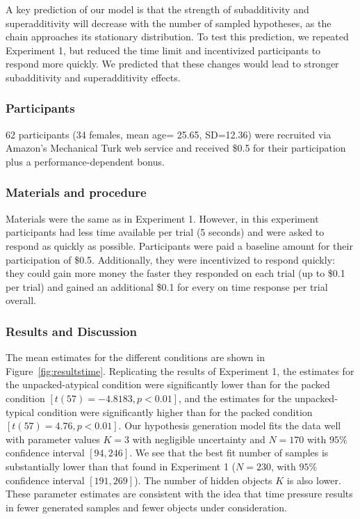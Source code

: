 A key prediction of our model is that the strength of subadditivity and superadditivity will decrease with the number of sampled hypotheses, as the chain approaches its stationary distribution. To test this prediction, we repeated Experiment 1, but reduced the time limit and incentivized participants to respond more quickly. We predicted that these changes would lead to stronger subadditivity and superadditivity effects.

\subsubsection{Participants}
62 participants (34 females, mean age= 25.65, SD=12.36) were recruited via Amazon's Mechanical Turk web service and received \$0.5 for their participation plus a performance-dependent bonus.

\subsubsection{Materials and procedure}
Materials were the same as in Experiment 1. However, in this experiment participants had less time available per trial (5 seconds) and were asked to respond as quickly as possible. Participants were paid a baseline amount for their participation of \$0.5. Additionally, they were incentivized to respond quickly: they could gain more money the faster they responded on each trial (up to \$0.1 per trial) and gained an additional \$0.1 for every on time response per trial overall.

\subsubsection{Results and Discussion}

The mean estimates for the different conditions are shown in Figure~\ref{fig:resultstime}. Replicating the results of Experiment 1, the estimates for the unpacked-atypical condition were significantly lower than for the packed condition $[t(57)=-4.8183, p<0.01]$, and the estimates for the unpacked-typical condition were significantly higher than for the packed condition $[t(57)=4.76, p<0.01]$. 
Our hypothesis generation model fits the data well with parameter values $K = 3$ with negligible uncertainty and $N = 170$ with $95\%$ confidence interval $[94, 246]$. We see that the best fit number of samples is substantially lower than that found in Experiment 1 ($N = 230$, with $95\%$ confidence interval $[191, 269]$).
The number of hidden objects $K$ is also lower. These parameter estimates are consistent with the idea that time pressure results in fewer generated samples and fewer objects under consideration. 

